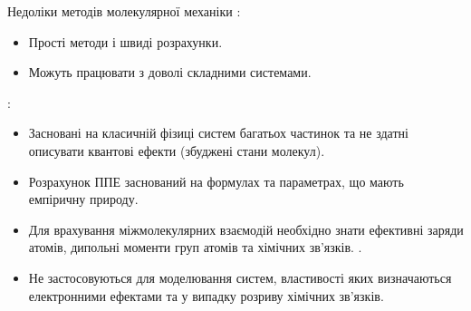 \documentclass[]{beamer}
\begin{document}
\begin{frame}{Недоліки методів молекулярної механіки}{}\small
	:
	\begin{itemize}
		\item Прості методи і швиді розрахунки.
		\item Можуть працювати з доволі складними системами.
	\end{itemize}

	:
	\begin{itemize}
		\item Засновані на класичній фізиці систем багатьох частинок та не здатні описувати квантові ефекти (збуджені стани молекул).
		\item Розрахунок ППЕ заснований на формулах та параметрах, що мають емпіричну природу.
		\item Для врахування міжмолекулярних взаємодій необхідно знати ефективні заряди атомів, дипольні моменти груп атомів та хімічних зв'язків. .
		\item Не застосовуються для моделювання систем, властивості яких визначаються електронними ефектами та у випадку розриву хімічних зв'язків.
	\end{itemize}
\end{frame}
\end{document}
